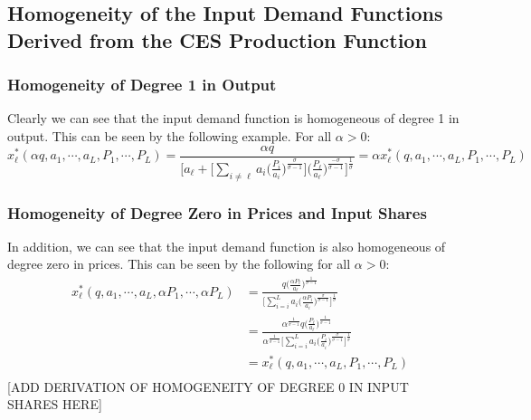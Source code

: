 \subsection{Homogeneity of the Input Demand Functions Derived from the CES Production Function}
\subsubsection{Homogeneity of Degree 1 in Output}
Clearly we can see that the input demand function is homogeneous of degree 1 in output.  This can be seen by the following example. For all $\alpha > 0$:
\begin{equation*}
x_{\ell}^{*}(\alpha q, a_1, \cdots, a_L, P_1, \cdots, P_L) = \frac{\alpha q}{\bigg[a_{\ell} + \Big[\sum_{i \neq \ell} a_i  \Big(\frac{P_i}{a_i} \Big)^{\frac{\sigma}{\sigma - 1}} \Big] \Big(\frac{P_{\ell}}{a_{\ell}} \Big)^{\frac{-\sigma}{\sigma - 1}} \bigg]^{\frac{1}{\sigma}}} = \alpha x_{\ell}^{*}(q, a_1, \cdots, a_L, P_1, \cdots, P_L)
\end{equation*}
\subsubsection{Homogeneity of Degree Zero in Prices and Input Shares}
In addition, we can see that the input demand function is also homogeneous of degree zero in prices.  This can be seen by the following for all $\alpha >0$:
\begin{equation*}
\begin{aligned}
&x_{\ell}^{*}(q, a_1, \cdots, a_L, \alpha P_1, \cdots, \alpha P_L) &= \frac{q \Big( \frac{\alpha P_{\ell}}{a_{\ell}} \Big)^{\frac{1}{\sigma - 1}}}{\bigg[\sum_{i=i}^L a_i \Big(\frac{\alpha P_i}{a_i}\Big)^\frac{\sigma}{\sigma-1} \bigg]^\frac{1}{\sigma}} \\
& &= \frac{\alpha^{\frac{1}{\sigma - 1}}q \Big( \frac{P_{\ell}}{a_{\ell}} \Big)^{\frac{1}{\sigma - 1}}}{\alpha^{\frac{1}{\sigma - 1}}\bigg[\sum_{i=i}^L a_i \Big(\frac{P_i}{a_i}\Big)^\frac{\sigma}{\sigma-1} \bigg]^\frac{1}{\sigma}} \\
& &= x_{\ell}^{*}(q, a_1, \cdots, a_L, P_1, \cdots, P_L) \\
\end{aligned}
\end{equation*}
[ADD DERIVATION OF HOMOGENEITY OF DEGREE 0 IN INPUT SHARES HERE]
